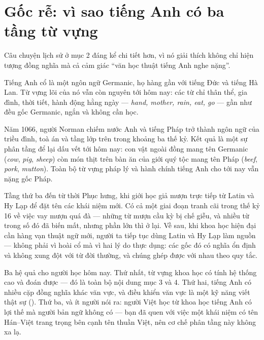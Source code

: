 \documentclass[../../english.tex]{subfiles}
\begin{document}
\section{Gốc rễ: vì sao tiếng Anh có ba tầng từ vựng}

Câu chuyện lịch sử ở mục 2 đáng kể chi tiết hơn, vì nó giải thích không chỉ hiện tượng đồng nghĩa mà cả cảm giác ``văn học thuật tiếng Anh nghe nặng''.

Tiếng Anh cổ là một ngôn ngữ Germanic, họ hàng gần với tiếng Đức và tiếng Hà Lan. Từ vựng lõi của nó vẫn còn nguyên tới hôm nay: các từ chỉ thân thể, gia đình, thời tiết, hành động hằng ngày --- \emph{hand, mother, rain, eat, go} --- gần như đều gốc Germanic, ngắn và không cần học.

Năm 1066, người Norman chiếm nước Anh và tiếng Pháp trở thành ngôn ngữ của triều đình, toà án và tầng lớp trên trong khoảng ba thế kỷ. Kết quả là một sự phân tầng để lại dấu vết tới hôm nay: con vật ngoài đồng mang tên Germanic (\emph{cow}, \emph{pig}, \emph{sheep}) còn món thịt trên bàn ăn của giới quý tộc mang tên Pháp (\emph{beef}, \emph{pork}, \emph{mutton}). Toàn bộ từ vựng pháp lý và hành chính tiếng Anh cho tới nay vẫn nặng gốc Pháp.

Tầng thứ ba đến từ thời Phục hưng, khi giới học giả mượn trực tiếp từ Latin và Hy Lạp để đặt tên các khái niệm mới. Có cả một giai đoạn tranh cãi trong thế kỷ 16 về việc vay mượn quá đà --- những từ mượn cầu kỳ bị chế giễu, và nhiều từ trong số đó đã biến mất, nhưng phần lớn thì ở lại. Về sau, khi khoa học hiện đại cần hàng vạn thuật ngữ mới, người ta tiếp tục dùng Latin và Hy Lạp làm nguồn --- không phải vì hoài cổ mà vì hai lý do thực dụng: các gốc đó có nghĩa ổn định và không xung đột với từ đời thường, và chúng ghép được với nhau theo quy tắc.

Ba hệ quả cho người học hôm nay. Thứ nhất, từ vựng khoa học có tính hệ thống cao và đoán được --- đó là toàn bộ nội dung mục 3 và 4. Thứ hai, tiếng Anh có nhiều cặp đồng nghĩa khác văn vực, và điều khiển văn vực là một kỹ năng viết thật sự (). Thứ ba, và ít người nói ra: người Việt học từ khoa học tiếng Anh có lợi thế mà người bản ngữ không có --- bạn đã quen với việc một khái niệm có tên Hán--Việt trang trọng bên cạnh tên thuần Việt, nên cơ chế phân tầng này không xa lạ.
\end{document}
